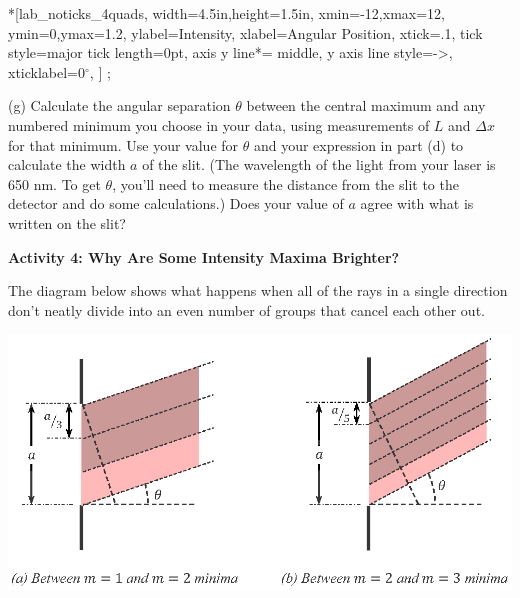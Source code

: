 \begin{lab_axis}*[lab_noticks_4quads,
	width=4.5in,height=1.5in,
	xmin=-12,xmax=12,
	ymin=0,ymax=1.2,
	ylabel=Intensity,
	xlabel=Angular Position,
	xtick={.1}, %
	tick style={major tick length=0pt},
	axis y line*= {middle, y axis line style={->}}, %
	xticklabel={0$^\circ$},
]
;
\end{lab_axis}

\pagebreak[3]

(g) Calculate the angular separation $\theta$ between the central maximum and any numbered minimum you choose in your data, using measurements of $L$ and $\Delta x$ for that minimum.  Use your value for $\theta$ and your expression in part (d) to calculate the width $a$ of the slit.  (The wavelength of the light from your laser is 650 nm.  To get $\theta$, you'll need to measure the distance from the slit to the detector and do some calculations.)    Does your value of $a$ agree with what is written on the slit?
\answerspace{1.0in}


\textbf{Activity 4: Why Are Some Intensity Maxima Brighter?}

The diagram below shows what happens when all of the rays in a single direction don't neatly divide into an even number of groups that cancel each other out.

{\centering \includegraphics{diffraction_of_light/diffraction_maxima_color.eps} \par}


